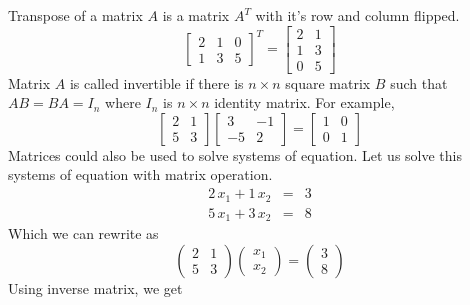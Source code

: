 \noindent Transpose of a matrix $A$ is a matrix $A^T$ with it's row and column flipped.
\begin{equation}
\begin{bmatrix}
	2&1  &0  \\
	1& 3 &5 
\end{bmatrix}^T=
\begin{bmatrix}
	2& 1 \\
	1& 3 \\
	0&5
\end{bmatrix}
\end{equation}
\noindent Matrix $A$ is called invertible if there is $n\times n$ square matrix $B$ such that $AB=BA=I_n$ where $I_n$ is $n\times n$ identity matrix. For example,
\begin{equation}
	\begin{bmatrix}
		2&1   \\
		5& 3 
	\end{bmatrix}
	\begin{bmatrix}
		3& -1 \\
		-5& 2 
	\end{bmatrix}=
	\begin{bmatrix}
		1& 0 \\
		0& 1 
	\end{bmatrix}
\end{equation}
\noindent Matrices could also be used to solve systems of equation. Let us solve this systems of equation with matrix operation.
\begin{equation}
\begin{aligned}
	2\, x_1 + 1\, x_2 &=& 3\\
	5\, x_1 + 3\, x_2 &=& 8
\end{aligned}
\end{equation}
\noindent Which we can rewrite as
\begin{equation}
\left(
\begin{array}{cc}
	2&1\\
	5&3
\end{array}
\right)
\left(
\begin{array}{c}
	x_1\\
	x_2 
\end{array}
\right)
=
\left(
\begin{array}{c}
	3\\
	8 
\end{array}
\right)
\end{equation}
\noindent Using inverse matrix, we get
